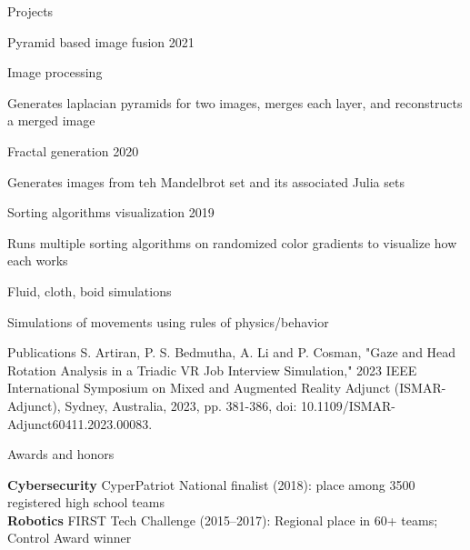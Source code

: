 \begin{rSection}{Projects}
\begin{multicols}{2}
			\begin{rSubsection}{Pyramid based image fusion} {} {2021}
				\item Image processing
				\item Generates laplacian pyramids for two images, merges each layer, and reconstructs a merged image
			\end{rSubsection}

			\begin{rSubsection}{Fractal generation} {} {2020}
				\item Generates images from teh Mandelbrot set and its associated Julia sets
			\end{rSubsection}

			\begin{rSubsection}{Sorting algorithms visualization} {} {2019}
				\item Runs multiple sorting algorithms on randomized color gradients to visualize how each works
			\end{rSubsection}

			\begin{rSubsection}{Fluid, cloth, boid simulations} {} {}
				\item Simulations of movements using rules of physics/behavior
			\end{rSubsection}
			
		\end{multicols}
	\end{rSection}

	\begin{rSection}{Publications}
		S. Artiran, P. S. Bedmutha, A. Li and P. Cosman, "Gaze and Head Rotation Analysis in a Triadic VR Job Interview Simulation," 2023 IEEE International Symposium on Mixed and Augmented Reality Adjunct (ISMAR-Adjunct), Sydney, Australia, 2023, pp. 381-386, doi: 10.1109/ISMAR-Adjunct60411.2023.00083.
	\end{rSection}

	\begin{rSection}{Awards and honors} 

		{\bf Cybersecurity} CyperPatriot National finalist (2018):  place among 3500 registered high school teams\\
		{\bf Robotics} FIRST Tech Challenge (2015--2017): Regional  place in 60+ teams; Control Award winner
		
	\end{rSection}



